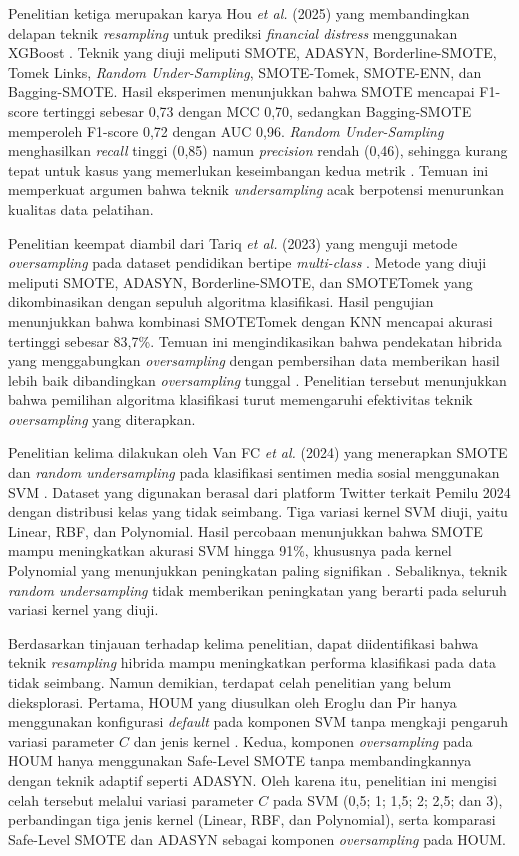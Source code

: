 Penelitian ketiga merupakan karya Hou \textit{et al.} (2025) yang membandingkan delapan teknik \textit{resampling} untuk prediksi \textit{financial distress} menggunakan XGBoost \cite{Hou2025XGBoost}. Teknik yang diuji meliputi SMOTE, ADASYN, Borderline-SMOTE, Tomek Links, \textit{Random Under-Sampling}, SMOTE-Tomek, SMOTE-ENN, dan Bagging-SMOTE. Hasil eksperimen menunjukkan bahwa SMOTE mencapai F1-score tertinggi sebesar 0,73 dengan MCC 0,70, sedangkan Bagging-SMOTE memperoleh F1-score 0,72 dengan AUC 0,96. \textit{Random Under-Sampling} menghasilkan \textit{recall} tinggi (0,85) namun \textit{precision} rendah (0,46), sehingga kurang tepat untuk kasus yang memerlukan keseimbangan kedua metrik \cite{Hou2025XGBoost}. Temuan ini memperkuat argumen bahwa teknik \textit{undersampling} acak berpotensi menurunkan kualitas data pelatihan.

Penelitian keempat diambil dari Tariq \textit{et al.} (2023) yang menguji metode \textit{oversampling} pada dataset pendidikan bertipe \textit{multi-class} \cite{Tariq2023Oversampling}. Metode yang diuji meliputi SMOTE, ADASYN, Borderline-SMOTE, dan SMOTETomek yang dikombinasikan dengan sepuluh algoritma klasifikasi. Hasil pengujian menunjukkan bahwa kombinasi SMOTETomek dengan KNN mencapai akurasi tertinggi sebesar 83,7\%. Temuan ini mengindikasikan bahwa pendekatan hibrida yang menggabungkan \textit{oversampling} dengan pembersihan data memberikan hasil lebih baik dibandingkan \textit{oversampling} tunggal \cite{Tariq2023Oversampling}. Penelitian tersebut menunjukkan bahwa pemilihan algoritma klasifikasi turut memengaruhi efektivitas teknik \textit{oversampling} yang diterapkan.

Penelitian kelima dilakukan oleh Van FC \textit{et al.} (2024) yang menerapkan SMOTE dan \textit{random undersampling} pada klasifikasi sentimen media sosial menggunakan SVM \cite{VanFC2024Enhancing}. Dataset yang digunakan berasal dari platform Twitter terkait Pemilu 2024 dengan distribusi kelas yang tidak seimbang. Tiga variasi kernel SVM diuji, yaitu Linear, RBF, dan Polynomial. Hasil percobaan menunjukkan bahwa SMOTE mampu meningkatkan akurasi SVM hingga 91\%, khususnya pada kernel Polynomial yang menunjukkan peningkatan paling signifikan \cite{VanFC2024Enhancing}. Sebaliknya, teknik \textit{random undersampling} tidak memberikan peningkatan yang berarti pada seluruh variasi kernel yang diuji.

Berdasarkan tinjauan terhadap kelima penelitian, dapat diidentifikasi bahwa teknik \textit{resampling} hibrida mampu meningkatkan performa klasifikasi pada data tidak seimbang. Namun demikian, terdapat celah penelitian yang belum dieksplorasi. Pertama, HOUM yang diusulkan oleh Eroglu dan Pir hanya menggunakan konfigurasi \textit{default} pada komponen SVM tanpa mengkaji pengaruh variasi parameter $C$ dan jenis kernel \cite{Eroglu2024HOUM}. Kedua, komponen \textit{oversampling} pada HOUM hanya menggunakan Safe-Level SMOTE tanpa membandingkannya dengan teknik adaptif seperti ADASYN. Oleh karena itu, penelitian ini mengisi celah tersebut melalui variasi parameter $C$ pada SVM (0,5; 1; 1,5; 2; 2,5; dan 3), perbandingan tiga jenis kernel (Linear, RBF, dan Polynomial), serta komparasi Safe-Level SMOTE dan ADASYN sebagai komponen \textit{oversampling} pada HOUM.



